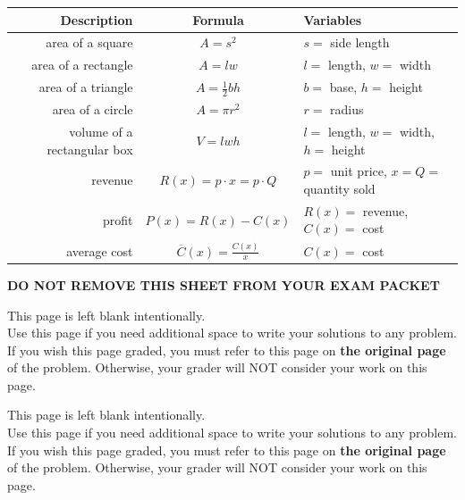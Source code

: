 \documentclass[11pt]{article}
\begin{document}
\begin{enumerate}
\begin{center}
    \begin{tabular}{ r | c | l }
    {\bf Description} & {\bf Formula} & {\bf Variables}\\
    \hline
    area of a square & $A=s^2$ & $s=$ side length\\
    \hline
    area of a rectangle & $A=lw$ & $l=$ length, $w=$ width\\
    \hline
    area of a triangle & $A=\frac12bh$ & $b=$ base, $h=$ height\\
    \hline
    area of a circle & $A=\pi r^2$ & $r=$ radius\\
    \hline
    volume of a rectangular box & $V=lwh$ & $l=$ length, $w=$ width, $h=$ height\\
    \hline
    revenue & $R(x) = p\cdot x = p\cdot Q$ & $p=$ unit price, $x=Q=$ quantity sold\\
    \hline
    profit & $P(x) = R(x) - C(x)$ & $R(x)=$ revenue, $C(x)=$ cost\\
    \hline
    average cost & $\overline C(x) = \frac{C(x)}{x}$ & $C(x)=$ cost\\
    \end{tabular}
\end{center}

\begin{center}
{\bf DO NOT REMOVE THIS SHEET FROM YOUR EXAM PACKET}
\end{center}

\newpage

This page is left blank intentionally.\\

Use this page if you need additional space to write your solutions to any problem. \\

If you wish this page graded, you must refer to this page on \textbf{the original page} of the problem. Otherwise, your grader will NOT consider your work on this page.

\newpage

This page is left blank intentionally.\\

Use this page if you need additional space to write your solutions to any problem. \\

If you wish this page graded, you must refer to this page on \textbf{the original page} of the problem. Otherwise, your grader will NOT consider your work on this page.


\end{enumerate}
\end{document}
